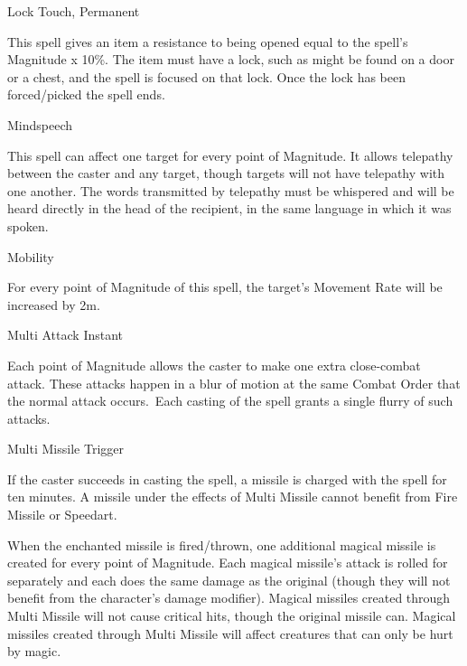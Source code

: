 \begin{rpg-spell}
{Lock}
{Touch, Permanent}

This spell gives an item a resistance to being opened equal to the spell’s Magnitude x 10\%. The item must have a lock, such as might be found on a door or a chest, and the spell is focused on that lock. Once the lock has been forced/picked the spell ends.
\end{rpg-spell}


\begin{rpg-spell}
{Mindspeech}
{}

This spell can affect one target for every point of Magnitude. It allows telepathy between the caster and any target, though targets will not have telepathy with one another. The words transmitted by telepathy must be whispered and will be heard directly in the head of the recipient, in the same language in which it was spoken. 
\end{rpg-spell}


\begin{rpg-spell}
{Mobility}
{}

For every point of Magnitude of this spell, the target’s Movement Rate will be increased by 2m.
\end{rpg-spell}


\begin{rpg-spell}
{Multi Attack}
{Instant}

Each point of Magnitude allows the caster to make one extra close-combat attack. These attacks happen in a blur of motion at the same Combat Order that the normal attack occurs. Each casting of the spell grants a single flurry of such attacks.
\end{rpg-spell}


\begin{rpg-spell}
{Multi Missile}
{Trigger}

If the caster succeeds in casting the spell, a missile is charged with the spell for ten minutes. A missile under the effects of Multi Missile cannot benefit from Fire Missile or Speedart. 

When the enchanted missile is fired/thrown, one additional magical missile is created for every point of Magnitude. Each magical missile’s attack is rolled for separately and each does the same damage as the original (though they will not benefit from the character’s damage modifier). Magical missiles created through Multi Missile will not cause critical hits, though the original missile can. Magical missiles created through Multi Missile will affect creatures that can only be hurt by magic. 
\end{rpg-spell}



